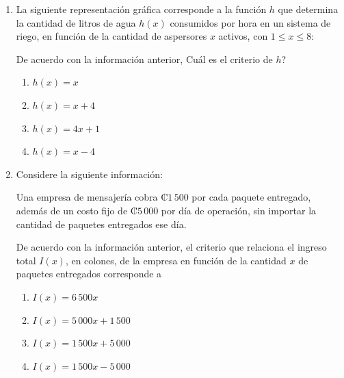 \documentclass[12pt]{article}
\newcommand{\puntograficoafirmacioncuatro}{0.09}
\begin{document}
\begin{enumerate}[label=\textbf{\arabic*.}, itemsep=2.5cm]
\Needspace{0.56\textheight}
\item
La siguiente representaci\'on gr\'afica corresponde a la funci\'on $h$ que determina la cantidad de litros de agua $h(x)$ consumidos por hora en un sistema de riego, en funci\'on de la cantidad de aspersores $x$ activos, con $1 \leq x \leq 8$:

\begin{center}
\end{center}

De acuerdo con la informaci\'on anterior, \textquestiondown Cu\'al es el criterio de $h$?

\begin{enumerate}[label=\Alph*)]
  \item $h(x) = x$
  \item $h(x) = x + 4$
  \item $h(x) = 4x + 1$
  \item $h(x) = x - 4$
\end{enumerate}

\Needspace{0.40\textheight}
\item
Considere la siguiente informaci\'on:

Una empresa de mensajer\'ia cobra ₡$1\,500$ por cada paquete entregado, adem\'as de un costo fijo de ₡$5\,000$ por d\'ia de operaci\'on, sin importar la cantidad de paquetes entregados ese d\'ia.

De acuerdo con la informaci\'on anterior, el criterio que relaciona el ingreso total $I(x)$, en colones, de la empresa en funci\'on de la cantidad $x$ de paquetes entregados corresponde a

\begin{enumerate}[label=\Alph*)]
  \item $I(x) = 6\,500x$
  \item $I(x) = 5\,000x + 1\,500$
  \item $I(x) = 1\,500x + 5\,000$
  \item $I(x) = 1\,500x - 5\,000$
\end{enumerate}


\end{enumerate}
\end{document}
